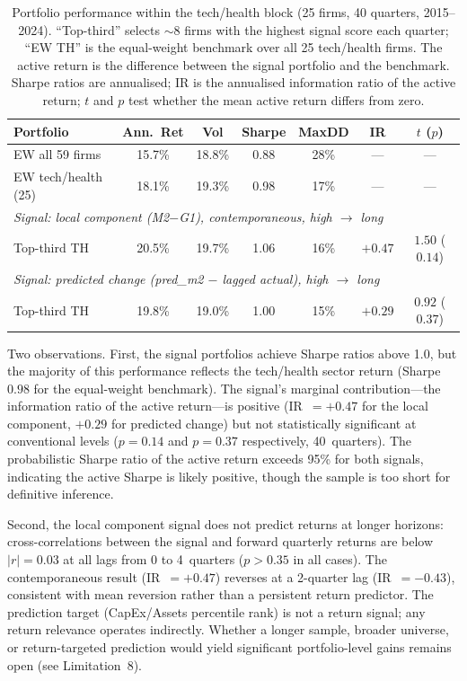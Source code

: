 \documentclass[11pt,a4paper]{article}
\begin{document}
\begin{table}[H]
\centering
\caption{Portfolio performance within the tech/health block (25 firms, 40 quarters, 2015--2024). ``Top-third'' selects ${\sim}8$ firms with the highest signal score each quarter; ``EW TH'' is the equal-weight benchmark over all 25 tech/health firms. The active return is the difference between the signal portfolio and the benchmark. Sharpe ratios are annualised; IR is the annualised information ratio of the active return; $t$ and $p$ test whether the mean active return differs from zero.}
\label{tab:portfolio}
\small
\begin{tabular}{lcccccc}
\toprule
Portfolio & Ann.\ Ret & Vol & Sharpe & MaxDD & IR & $t$ ($p$) \\
\midrule
EW all 59 firms        & 15.7\% & 18.8\% & 0.88 & 28\% & --- & --- \\
EW tech/health (25)    & 18.1\% & 19.3\% & 0.98 & 17\% & --- & --- \\
\midrule
\multicolumn{7}{l}{\emph{Signal: local component (M2$-$G1), contemporaneous, high $\to$ long}} \\
Top-third TH           & 20.5\% & 19.7\% & 1.06 & 16\% & $+0.47$ & $1.50$ ($0.14$) \\
\midrule
\multicolumn{7}{l}{\emph{Signal: predicted change (pred\_m2 $-$ lagged actual), high $\to$ long}} \\
Top-third TH           & 19.8\% & 19.0\% & 1.00 & 15\% & $+0.29$ & $0.92$ ($0.37$) \\
\bottomrule
\end{tabular}
\end{table}

Two observations. First, the signal portfolios achieve Sharpe ratios above 1.0, but the majority of this performance reflects the tech/health sector return (Sharpe $0.98$ for the equal-weight benchmark). The signal's marginal contribution---the information ratio of the active return---is positive (IR~$= +0.47$ for the local component, $+0.29$ for predicted change) but not statistically significant at conventional levels ($p = 0.14$ and $p = 0.37$ respectively, 40~quarters). The probabilistic Sharpe ratio of the active return exceeds 95\% for both signals, indicating the active Sharpe is likely positive, though the sample is too short for definitive inference.

Second, the local component signal does not predict returns at longer horizons: cross-correlations between the signal and forward quarterly returns are below $|r| = 0.03$ at all lags from 0 to 4~quarters ($p > 0.35$ in all cases). The contemporaneous result (IR~$= +0.47$) reverses at a 2-quarter lag (IR~$= -0.43$), consistent with mean reversion rather than a persistent return predictor. The prediction target (CapEx/Assets percentile rank) is not a return signal; any return relevance operates indirectly. Whether a longer sample, broader universe, or return-targeted prediction would yield significant portfolio-level gains remains open (see Limitation~8).
\end{document}
